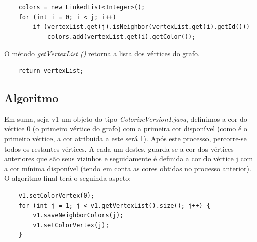 \documentclass[a4paper,12pt]{report}
\begin{document}
\begin{center}
\end{center}

\begin{lstlisting}
    colors = new LinkedList<Integer>();
    for (int i = 0; i < j; i++)
        if (vertexList.get(j).isNeighbor(vertexList.get(i).getId()))
            colors.add(vertexList.get(i).getColor());
\end{lstlisting}

O método \textit{getVertexList ()} retorna a lista dos vértices do grafo.

\begin{lstlisting}
    return vertexList;
\end{lstlisting}

\subsection{Algoritmo}

Em suma, seja v1 um objeto do tipo \textit{ColorizeVersion1.java}, definimos a cor do vértice 0 (o primeiro vértice do grafo) com a primeira cor disponível (como é o primeiro vértice, a cor atribuida a este será 1).
Após este processo, percorre-se todos os restantes vértices. A cada um destes, guarda-se a cor dos vértices anteriores que são seus vizinhos e seguidamente é definida a cor do vértice j com a cor mínima disponível (tendo em conta as cores obtidas no processo anterior).
O algoritmo final terá o seguinda aspeto:
\begin{lstlisting}
    v1.setColorVertex(0);
    for (int j = 1; j < v1.getVertexList().size(); j++) {
        v1.saveNeighborColors(j);
        v1.setColorVertex(j);
    }
\end{lstlisting}
\end{document}
